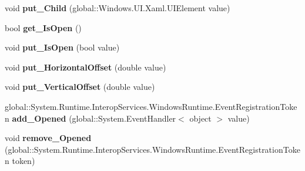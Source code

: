 \begin{DoxyCompactItemize}
void {\bfseries put\+\_\+\+Child} (global\+::\+Windows.\+U\+I.\+Xaml.\+U\+I\+Element value)
\item 
\mbox{\label{class_windows_1_1_u_i_1_1_xaml_1_1_controls_1_1_primitives_1_1_popup_a5a40e3cb4731adefc4b10d02ddf2f333}} 
bool {\bfseries get\+\_\+\+Is\+Open} ()
\item 
\mbox{\label{class_windows_1_1_u_i_1_1_xaml_1_1_controls_1_1_primitives_1_1_popup_a00b5ecaf18b7393169b9e446d9047b66}} 
void {\bfseries put\+\_\+\+Is\+Open} (bool value)
\item 
\mbox{\label{class_windows_1_1_u_i_1_1_xaml_1_1_controls_1_1_primitives_1_1_popup_aeca30f18059cce5584174e60642efeb4}} 
void {\bfseries put\+\_\+\+Horizontal\+Offset} (double value)
\item 
\mbox{\label{class_windows_1_1_u_i_1_1_xaml_1_1_controls_1_1_primitives_1_1_popup_ae5934841bb34664eff76c0d774136250}} 
void {\bfseries put\+\_\+\+Vertical\+Offset} (double value)
\item 
\mbox{\label{class_windows_1_1_u_i_1_1_xaml_1_1_controls_1_1_primitives_1_1_popup_a8b0251aa9963ecedfdcfe3e2def06542}} 
global\+::\+System.\+Runtime.\+Interop\+Services.\+Windows\+Runtime.\+Event\+Registration\+Token {\bfseries add\+\_\+\+Opened} (global\+::\+System.\+Event\+Handler$<$ object $>$ value)
\item 
\mbox{\label{class_windows_1_1_u_i_1_1_xaml_1_1_controls_1_1_primitives_1_1_popup_aac5bdd545f4a48100c8fa489c320115d}} 
void {\bfseries remove\+\_\+\+Opened} (global\+::\+System.\+Runtime.\+Interop\+Services.\+Windows\+Runtime.\+Event\+Registration\+Token token)
\item 
\mbox{\label{class_windows_1_1_u_i_1_1_xaml_1_1_controls_1_1_primitives_1_1_popup_aab8f3210f2e0f3757fa03b86108c4603}} 

\end{DoxyCompactItemize}
